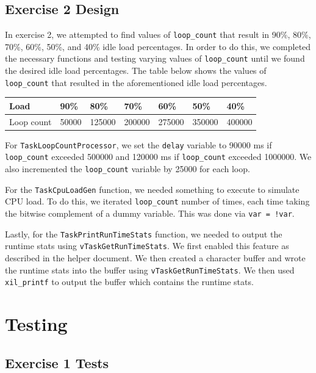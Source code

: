 \documentclass[11pt, letterpaper, titlepage]{article}
\begin{document}
\subsection{Exercise 2 Design}
In exercise 2, we attempted to find values of \texttt{loop_count} that result in 90\%, 80\%, 70\%, 60\%, 50\%, and 40\% idle load percentages. In order to do this, we completed the necessary functions and testing varying values of \texttt{loop_count} until we found the desired idle load percentages. The table below shows the values of \texttt{loop_count} that resulted in the aforementioned idle load percentages.
\begin{tabularx}{\textwidth}{|X|X|X|X|X|X|X|}
    \caption{\texttt{loop_count} values for the corresponding idle load percentages} \\
    \hline
    Load & 90\% & 80\% & 70\% & 60\% & 50\% & 40\%  \\ \hline
    Loop count & 50000 & 125000 & 200000 & 275000 & 350000 & 400000 \\ \hline
\end{tabularx}

For \texttt{TaskLoopCountProcessor}, we set the \texttt{delay} variable to 90000 ms if \texttt{loop_count} exceeded 500000 and 120000 ms if \texttt{loop_count} exceeded 1000000. We also incremented the \texttt{loop_count} variable by 25000 for each loop. 

For the \texttt{TaskCpuLoadGen} function, we needed something to execute to simulate CPU load. To do this, we iterated \texttt{loop_count} number of times, each time taking the bitwise complement of a dummy variable. This was done via \texttt{var = !var}.

Lastly, for the \texttt{TaskPrintRunTimeStats} function, we needed to output the runtime stats using \texttt{vTaskGetRunTimeStats}. We first enabled this feature as described in the helper document. We then created a character buffer and wrote the runtime stats into the buffer using \texttt{vTaskGetRunTimeStats}. We then used \texttt{xil_printf} to output the buffer which contains the runtime stats.

\section{Testing}

\subsection{Exercise 1 Tests}
\end{document}
